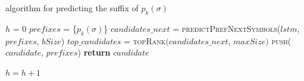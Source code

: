 \begin{algorithm}
	\caption{\protrack algorithm for predicting the suffix of $p_k(\sigma)$}
	\label{alg:protrack}
	\begin{algorithmic}[1]
		\State $h$ = 0
		\State $prefixes$ = \{$p_k(\sigma)$\}\label{lst2:initialization}
		 \label{lst2:while}
			\State $candidates\_next$ = \textsc{predictPrefNextSymbols}($lstm$, $prefixes$, $bSize$) \label{lst2:prediction}
			\State $top\_candidates$ = \textsc{topRank}$(candidates\_next$, $maxSize)$ \label{lst2:top}
			 \label{lst2:forall}
						\State \textsc{push}($candidate$, $prefixes$)
\Else
					 \label{lst2:compliant}
\State \textbf{return} $candidate$

\EndIf
				\EndIf
			\EndFor
			\State $h = h + 1$
		\EndWhile
		\EndFunction
	\end{algorithmic}
\end{algorithm}




